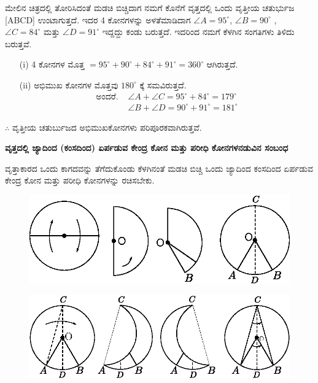  ಮೇಲಿನ ಚಿತ್ರದಲ್ಲಿ ತೋರಿಸಿದಂತೆ ಮಡಚಿ ಬಿಚ್ಚಿದಾಗ ನಮಗೆ ಕೊನೆಗೆ ವೃತ್ತದಲ್ಲಿ ಒಂದು ವೃತ್ತೀಯ ಚತುರ್ಭುಜ [ABCD] ಉಂಟಾಗುತ್ತದೆ. ಇದರ 4 ಕೋನಗಳನ್ನು ಅಳತೆಮಾಡಿದಾಗ  $\angle A = 95^\circ$, $\angle B = 90^\circ$ , $\angle C = 84^\circ$ ಮತ್ತು $\angle D = 91^\circ$ ಇದ್ದದ್ದು ಕಂಡು ಬರುತ್ತದೆ. ಇದರಿಂದ ನಮಗೆ ಕೆಳಗಿನ ಸಂಗತಿಗಳು ತಿಳಿದು ಬರುತ್ತವೆ.
 \begin{itemize}
 \item[(i)] 4 ಕೋನಗಳ ಮೊತ್ತ $= 95^\circ + 90^\circ + 84^\circ + 91^\circ =360^\circ $ ಆಗಿರುತ್ತದೆ. 
 
 \item[(ii)] ಅಭಿಮುಖ ಕೋನಗಳ ಮೊತ್ತವು  $180^\circ$ ಕ್ಕೆ  ಸಮವಿರುತ್ತದೆ. 
 \begin{align*}
 \text{ಅಂದರೆ. } & \angle A + \angle C = 95^\circ + 84^\circ = 179^\circ \\
 & \angle  B + \angle  D = 90^\circ + 91^\circ = 181^\circ
 \end{align*}
 \end{itemize}
 
 $\therefore$ ವೃತ್ತೀಯ ಚತುರ್ಬುಜದ ಅಭಿಮುಖಕೋನಗಳು ಪರಿಪೂರಕವಾಗಿರುತ್ತವೆ. 
  
 \noindent
 \textbf{ವೃತ್ತದಲ್ಲಿ ಜ್ಯಾದಿಂದ (ಕಂಸದಿಂದ) ಏರ್ಪಡುವ ಕೇಂದ್ರ ಕೋನ ಮತ್ತು ಪರೀಧಿ ಕೋನಗಳ\break ನಡುವಿನ ಸಂಬಂಧ}
 
ವೃತ್ತಾಕಾರದ ಒಂದು ಕಾಗದವನ್ನು ತೆಗೆದುಕೊಂಡು ಕೆಳಗಿನಂತೆ ಮಡಚಿ ಬಿಚ್ಚಿ ಒಂದು ಜ್ಯಾದಿಂದ ಕಂಸದಿಂದ ಏರ್ಪಡುವ ಕೇಂದ್ರ ಕೋನ ಮತ್ತು ಪರೀಧಿ ಕೋನಗಳನ್ನು ರಚಿಸಬೇಕು. 
\begin{figure}[H]
\centering
\includegraphics[scale=.9]{src/figure/chap1/fig1-34a.eps}
\end{figure}
    \begin{figure}[H]
\centering
\includegraphics[scale=.85]{src/figure/chap1/fig1-34b.eps}
\end{figure}
 

